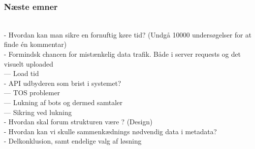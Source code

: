 

\subsubsection{Næste emner}
\\
- Hvordan kan man sikre en fornuftig køre tid? (Undgå 10000 undersøgelser for at finde én kommentar)\\
- Formindsk chancen for mistænkelig data trafik. Både i server requests og det visuelt uploaded\\
--- Load tid
\\
- API udbyderen som brist i systemet?\\

--- TOS problemer\\
--- Lukning af bots og dermed samtaler\\
--- Sikring ved lukning
\\
- Hvordan skal forum strukturen være ? (Design)
\\
- Hvordan kan vi skulle sammenkædnings nødvendig data i metadata?
\\
- Delkonklusion, samt endelige valg af løsning






